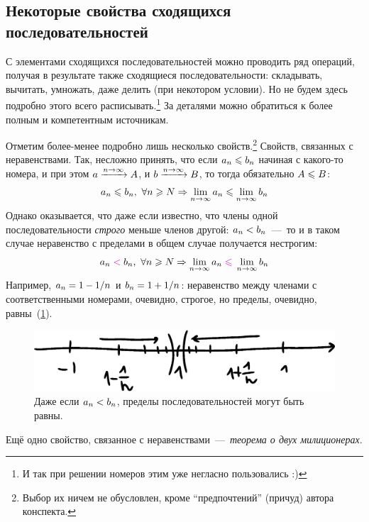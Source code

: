 \documentclass[a4paper,12pt]{article}
\begin{document}
  
  \subsection{Некоторые свойства сходящихся последовательностей}
  
  С элементами сходящихся последовательностей можно проводить ряд операций, получая в результате также сходящиеся последовательности: складывать, вычитать, умножать, даже делить (при некотором условии).
  Но не будем здесь подробно этого всего расписывать.\footnote{И так при решении номеров этим уже негласно пользовались :)}
  За деталями можно обратиться к более полным и компетентным источникам.
  
  Отметим более-менее подробно лишь несколько свойств.\footnote{Выбор их ничем не обусловлен, кроме ``предпочтений'' (причуд) автора конспекта.}
  Свойств, связанных с неравенствами.
  Так, несложно принять, что если $a_n \hm\leq b_n$ начиная с какого-то номера, и при этом $a \hm{\xrightarrow{n \to \infty}} A$, и $b \hm{\xrightarrow{n \to \infty}} B$, то тогда обязательно $A \hm\leq B$:
  \[
    a_n \hm\leq b_n,\ \forall n \geq N \Rightarrow \lim_{n \to\infty} a_n \leq \lim_{n \to \infty} b_n
  \]
  Однако оказывается, что даже если известно, что члены одной последовательности \emph{строго} меньше членов другой: $a_n \hm< b_n$~---~то и в таком случае неравенство с пределами в общем случае получается нестрогим:
  \[
    a_n \textcolor{pink}{{}<{}} b_n,\ \forall n \geq N \Rightarrow \lim_{n \to\infty} a_n \textcolor{pink}{{}\leq{}} \lim_{n \to \infty} b_n
  \]
  Например, $a_n \hm= 1 \hm- 1\hm/n$ и $b_n \hm= 1 \hm+ 1\hm/ n$: неравенство между членами с соответственными номерами, очевидно, строгое, но пределы, очевидно, равны~(\ref{fig:an-less-than-bn}).
  
  \begin{figure}[ht]
    \centering
    \includegraphics[width=0.6\linewidth]{images/an-less-than-bn}
    
    \caption{
      Даже если $a_n \hm< b_n$, пределы последовательностей могут быть равны.
    }
    \label{fig:an-less-than-bn}
  \end{figure}
  
  Ещё одно свойство, связанное с неравенствами~---~\emph{теорема о двух милиционерах}.
  
\end{document}
